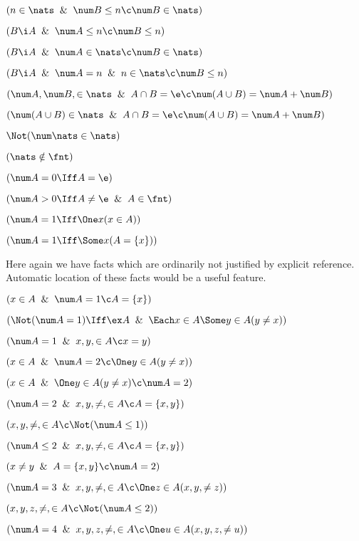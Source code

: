  $(n \in \nats \And \num B \le n \c \num B \in \nats)$

 $(B \i A \And \num A \le n \c \num B \le n)$

 $(B \i A \And \num A \in \nats \c \num B \in \nats)$

 $(B \i A \And \num A = n \And n \in \nats\c \num B \le n)$

 $(\num A ,\num B ,\in \nats\And A \cap B = \e \c\num(A \cup B)=\num A+\num B)$

 $(\num (A \cup B)\in \nats\And A \cap B = \e \c\num(A \cup B)=\num A+\num B)$

 $\Not(\num\nats \in \nats)$

 $(\nats \notin \fnt)$

 $(\num A = 0 \Iff A = \e)$

 $(\num A > 0 \Iff A \ne \e \And A \in \fnt)$

 $(\num A = 1 \Iff \One x (x \in A))$

 $(\num A = 1 \Iff \Some x (A = \{x\}))$
\lineb


Here again we have facts which are ordinarily not justified
by explicit reference.  Automatic location of these facts
would be a useful feature.
\lineb

 $(x \in A \And \num A = 1 \c A = \{x\})$

 $(\Not(\num A = 1) \Iff \ex A \And \Each x \in A \Some y \in A(y\ne x))$

 $(\num A =  1 \And x,y, \in A \c x = y)$

 $(x \in A \And \num A = 2 \c \One y\in A(y \ne x))$

 $(x \in A \And \One y \in A(y \ne x) \c \num A = 2)$

 $(\num A = 2 \And x,y,\ne,\in A \c A = \{x,y\})$

 $(x,y,\ne,\in A \c \Not(\num A \le 1))$

 $(\num A \le 2 \And x,y,\ne,\in A \c A = \{x,y\})$

 $(x \ne y \And A = \{x,y\} \c \num A = 2)$

 $(\num A = 3 \And x,y,\ne,\in A \c
\One z \in A (x,y,\ne z))$

 $(x,y,z,\ne,\in A \c \Not(\num A \le 2))$

 $(\num A = 4 \And x,y,z,\ne,\in A \c
\One u \in A(x,y,z,\ne u))$

